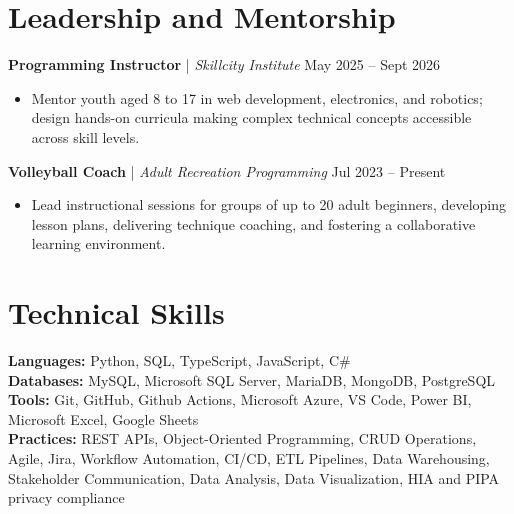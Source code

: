 \documentclass[11pt, letterpaper]{article}
\begin{document}
\section{Leadership and Mentorship}

\textbf{Programming Instructor} | \textit{Skillcity Institute} \hfill May 2025 -- Sept 2026
\begin{itemize}
    \item Mentor youth aged 8 to 17 in web development, electronics, and robotics; design hands-on curricula making complex technical concepts accessible across skill levels.
\end{itemize}
\textbf{Volleyball Coach} | \textit{Adult Recreation Programming} \hfill Jul 2023 -- Present
\begin{itemize}
    \item Lead instructional sessions for groups of up to 20 adult beginners, developing lesson plans, delivering technique coaching, and fostering a collaborative learning environment.
\end{itemize}

\section{Technical Skills}

\textbf{Languages:} Python, SQL, TypeScript, JavaScript, C\# \\
\textbf{Databases:} MySQL, Microsoft SQL Server, MariaDB, MongoDB, PostgreSQL \\
\textbf{Tools:} Git, GitHub, Github Actions, Microsoft Azure, VS Code, Power BI, Microsoft Excel, Google Sheets \\
\textbf{Practices:} REST APIs, Object-Oriented Programming, CRUD Operations, Agile, Jira, Workflow Automation, CI/CD, ETL Pipelines, Data Warehousing, Stakeholder Communication, Data Analysis, Data Visualization, HIA and PIPA privacy compliance
\end{document}
